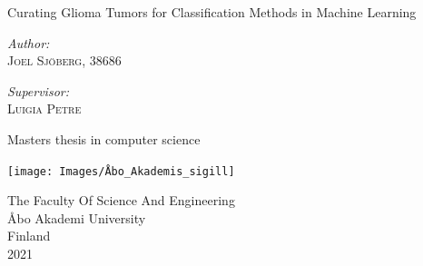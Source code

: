 \documentclass[a4paper, 12pt, oneside]{book}
\begin{document}
\pagestyle{empty}    
\begingroup
{}


\begin{titlepage}
    \begin{center}
        \vspace*{1cm}
            
         
        \vspace{1.5cm}

\vspace{0.4cm}

{\huge Curating Glioma Tumors for Classification Methods in Machine Learning} \\[0.4cm]

\vspace{1.5cm}         
        
\begin{minipage}{0.4\textwidth}
\begin{flushleft} \large
\emph{Author:}\\
\textsc{Joel Sjöberg, 38686}
\end{flushleft}
\end{minipage}
\begin{minipage}{0.4\textwidth}
\begin{flushright} \large
\emph{Supervisor:} \\
\textsc{Luigia Petre}
\end{flushright}
\end{minipage}        
        
        
        \Huge
        \vfill
        
        Masters thesis in computer science
            
        \vspace{0.8cm}
            
        \texttt{[image: Images/Åbo\_Akademis\_sigill]}
            
        \Large
        The Faculty Of Science And Engineering\\
        Åbo Akademi University\\
        Finland\\
        2021
            
    \end{center}
\end{titlepage}
\end{document}
